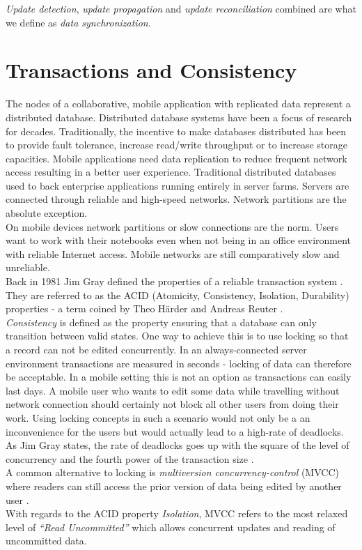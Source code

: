 \emph{Update detection}, \emph{update propagation} and \emph{update reconciliation} combined are what we define as \emph{data synchronization}.

\section{Transactions and Consistency}
\label{sec:background.transactions}
The nodes of a collaborative, mobile application with replicated data represent a distributed database.
Distributed database systems have been a focus of research for decades.
Traditionally, the incentive to make databases distributed has been to provide fault tolerance, increase read/write throughput or to increase storage capacities.
Mobile applications need data replication to reduce frequent network access resulting in a better user experience.
Traditional distributed databases used to back enterprise applications running entirely in server farms.
Servers are connected through reliable and high-speed networks.
Network partitions are the absolute exception.\\
On mobile devices network partitions or slow connections are the norm.
Users want to work with their notebooks even when not being in an office environment with reliable Internet access.
Mobile networks are still comparatively slow and unreliable.\\

Back in 1981 Jim Gray defined the properties of a reliable transaction system \cite{Gray:1981wi}.
They are referred to as the ACID (Atomicity, Consistency, Isolation, Durability) properties - a term coined by  Theo Härder and Andreas Reuter \cite{haerder1983principles}.\\
\emph{Consistency} is defined as the property ensuring that a database can only transition between valid states.
One way to achieve this is to use locking so that a record can not be edited concurrently.
In an always-connected server environment transactions are measured in seconds - locking of data can therefore be acceptable.
In a mobile setting this is not an option as transactions can easily last days.
A mobile user who wants to edit some data while travelling without network connection should certainly not block all other users from doing their work.
Using locking concepts in such a scenario would not only be a an inconvenience for the users but would actually lead to a high-rate of deadlocks.
As Jim Gray states, the rate of deadlocks goes up with the square of the level of concurrency and the fourth power of the transaction size \cite{gray1981strawman}.\\
A common alternative to locking is \emph{multiversion concurrency-control} (MVCC) where readers can still access the prior version of data being edited by another user \cite{Bernstein:1981ut}.\\
With regards to the ACID property \emph{Isolation}, MVCC refers to the most relaxed level of \emph{``Read Uncommitted''} which allows concurrent updates and reading of uncommitted data.\\

